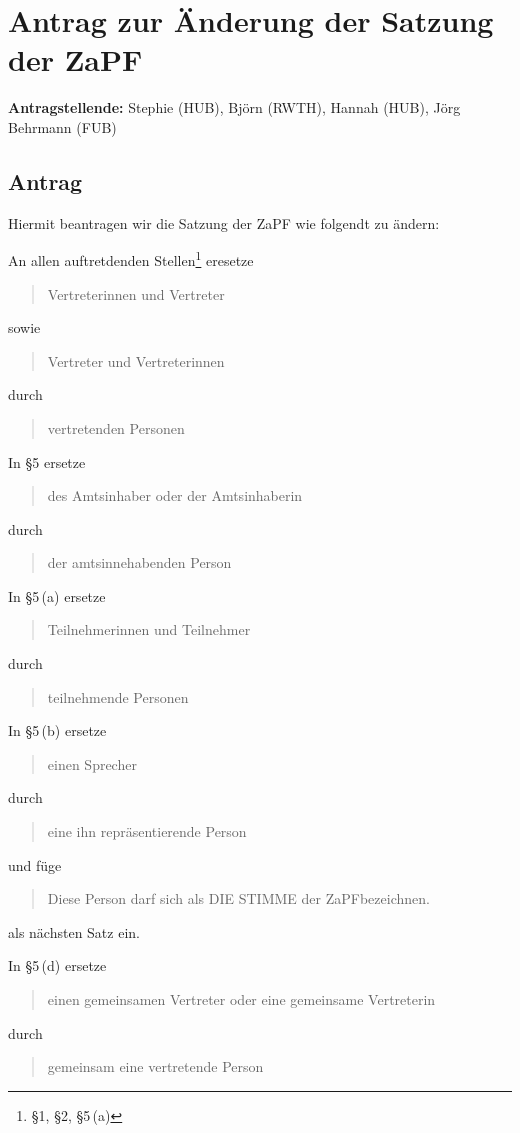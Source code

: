 \documentclass[draft,10pt,oneside]{scrartcl}
\begin{document}
\section*{Antrag zur Änderung der Satzung der ZaPF}

\textbf{Antragstellende:} Stephie (HUB), Björn (RWTH), Hannah (HUB), Jörg Behrmann (FUB)

\subsection*{Antrag}

Hiermit beantragen wir die Satzung der ZaPF wie folgendt zu ändern:

An allen auftretdenden Stellen\footnote{§1, §2, §5\,(a)} eresetze
\begin{quote}
    Vertreterinnen und Vertreter
\end{quote}
sowie
\begin{quote}
    Vertreter und Vertreterinnen
\end{quote}
durch
\begin{quote}
    vertretenden Personen
\end{quote}

In §5 ersetze
\begin{quote}
    des Amtsinhaber oder der Amtsinhaberin
\end{quote}
durch
\begin{quote}
    der amtsinnehabenden Person
\end{quote}

In §5\,(a) ersetze
\begin{quote}
    Teilnehmerinnen und Teilnehmer
\end{quote}
durch
\begin{quote}
    teilnehmende Personen
\end{quote}

In §5\,(b) ersetze
\begin{quote}
    einen Sprecher
\end{quote}
durch
\begin{quote}
    eine ihn repräsentierende Person
\end{quote}
und füge
\begin{quote}
    Diese Person darf sich als \glqq{}DIE STIMME der ZaPF\grqq bezeichnen.
\end{quote}
als nächsten Satz ein.

In §5\,(d) ersetze
\begin{quote}
    einen gemeinsamen Vertreter oder eine gemeinsame Vertreterin
\end{quote}
durch
\begin{quote}
    gemeinsam eine vertretende Person
\end{quote}
\end{document}
